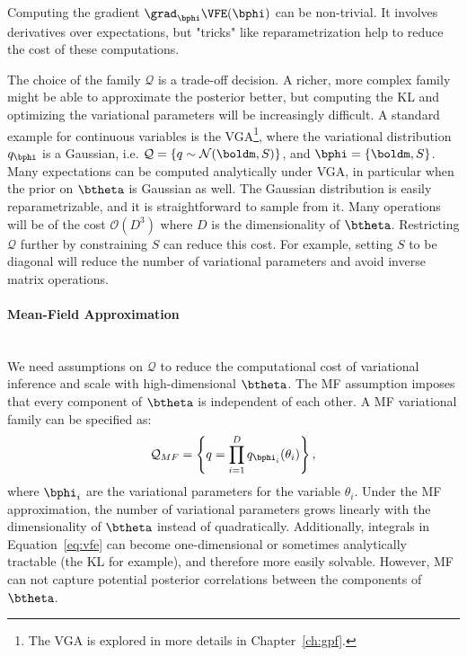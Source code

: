 Computing the gradient $\grad_{\bphi}\VFE(\bphi)$ can be non-trivial.
It involves derivatives over expectations, but "tricks" like reparametrization \cite{titsiasDoublyStochasticVariational} help to reduce the cost of these computations.

The choice of the family $\mathcal{Q}$ is a trade-off decision.
A richer, more complex family might be able to approximate the posterior better, but computing the \ac{KL} and optimizing the variational parameters will be increasingly difficult.
A standard example for continuous variables is the \ac{VGA}\footnote{The \ac{VGA} is explored in more details in Chapter~\ref{ch:gpf}.}, where the variational distribution $q_{\bphi}$ is a Gaussian, i.e. $\mathcal{Q} = \left\{q \sim \mathcal{N}(\boldm, S)\right\}$, and $\bphi = \{\boldm, S\}$.
Many expectations can be computed analytically under \ac{VGA}, in particular when the prior on $\btheta$ is Gaussian as well.
The Gaussian distribution is easily reparametrizable, and it is straightforward to sample from it.
Many operations will be of the cost $\mathcal{O}(D^3)$ where $D$ is the dimensionality of $\btheta$.
Restricting $\mathcal{Q}$ further by constraining $S$ can reduce this cost.
For example, setting $S$ to be diagonal will reduce the number of variational parameters and avoid inverse matrix operations.

\paragraph{Mean-Field Approximation}\mbox{}\\
We need assumptions on $\mathcal{Q}$ to reduce the computational cost of variational inference and scale with high-dimensional $\btheta$.
The \ac{MF} assumption imposes that every component of $\btheta$ is independent of each other.
A \ac{MF} variational family can be specified as:
\begin{align}
    \mathcal{Q}_{MF}= \left\{q = \prod_{i=1}^D q_{\bphi_i}(\theta_i)\right\},
\end{align}
where $\bphi_i$ are the variational parameters for the variable $\theta_i$.
Under the \ac{MF} approximation, the number of variational parameters grows linearly with the dimensionality of $\btheta$ instead of quadratically.
Additionally, integrals in Equation~\eqref{eq:vfe} can become one-dimensional or sometimes analytically tractable (the \ac{KL} for example), and therefore more easily solvable.
However, \ac{MF} can not capture potential posterior correlations between the components of $\btheta$.

